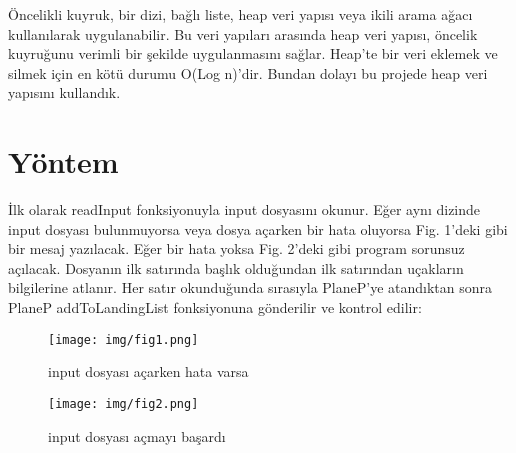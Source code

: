 \documentclass[conference]{IEEEtran}
\begin{document}
{\begin{itemize}
\end{itemize}

Öncelikli kuyruk, bir dizi, bağlı liste, heap veri yapısı veya ikili arama ağacı kullanılarak uygulanabilir. Bu veri yapıları arasında heap veri yapısı, öncelik kuyruğunu verimli bir şekilde uygulanmasını sağlar. Heap’te bir veri eklemek ve silmek için en kötü durumu O(Log n)’dir. Bundan dolayı bu projede heap veri yapısını kullandık.
}


\section*{\textbf{\LARGE Yöntem}}

İlk olarak readInput fonksiyonuyla input dosyasını okunur. Eğer aynı dizinde input dosyası bulunmuyorsa veya dosya açarken bir hata oluyorsa Fig. 1’deki gibi bir mesaj yazılacak. Eğer bir hata yoksa Fig. 2’deki gibi program sorunsuz açılacak. Dosyanın ilk satırında başlık olduğundan ilk satırından uçakların bilgilerine atlanır. Her satır okunduğunda sırasıyla PlaneP’ye atandıktan sonra PlaneP addToLandingList fonksiyonuna gönderilir ve kontrol edilir:

\begin{figure}[h]
    \centering
    \texttt{[image: img/fig1.png]}
    \caption{input dosyası açarken hata varsa}
    \label{Şekil:1}
\end{figure}

\begin{figure}[h]
    \centering
    \texttt{[image: img/fig2.png]}
    \caption{input dosyası açmayı başardı}
    \label{Şekil:2}
\end{figure}
\end{document}
